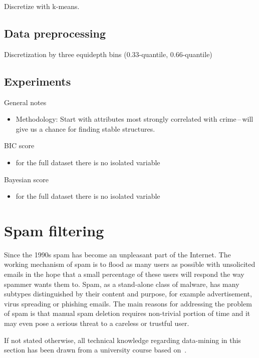 \documentclass[english,cover]{fitthesis} %
\newcommand{\todo}[1]{{\color{red}#1}}
\begin{document}
\todo{Discretize with k-means.}



\subsection{Data preprocessing}
Discretization by three equidepth bins (0.33-quantile, 0.66-quantile)


\subsection{Experiments}
General notes
\begin{itemize}
    \item Methodology: Start with attributes most strongly correlated with crime\,--\,will give us a chance for finding stable structures.
\end{itemize}

BIC score
\begin{itemize}
    \item for the full dataset there is no isolated variable
\end{itemize}

Bayesian score
\begin{itemize}
    \item for the full dataset there is no isolated variable
\end{itemize}


\section{Spam filtering}
Since the 1990s spam has become an unpleasant part of the Internet. The working mechanism of spam is to flood as many users as possible with unsolicited emails in the hope that a small percentage of these users will respond the way spammer wants them to. Spam, as a stand-alone class of malware, has many subtypes distinguished by their content and purpose, for example advertisement, virus spreading or phishing emails. The main reasons for addressing the problem of spam is that manual spam deletion requires non-trivial portion of time and it may even pose a serious threat to a careless or trustful user.

If not stated otherwise, all technical knowledge regarding data-mining in this section has been drawn from a university course based on~\cite{han_datamining}.
\end{document}
